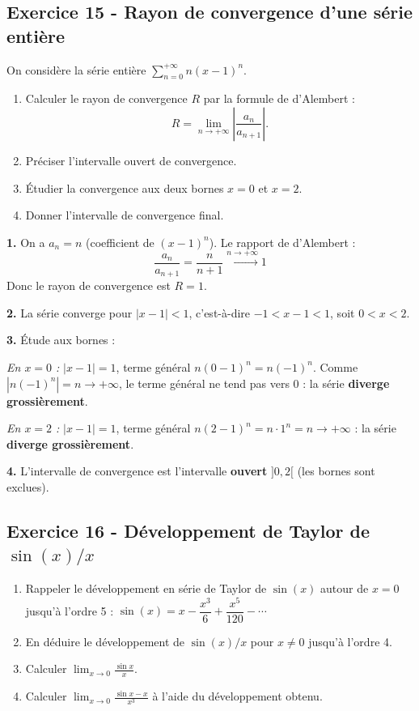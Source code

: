 \documentclass[12pt,a4paper]{article}
\begin{document}
\subsection*{Exercice 15 - Rayon de convergence d'une série entière \niveau{\moyen}}

\begin{boiteexercice}
On considère la série entière $\displaystyle\sum_{n=0}^{+\infty} n(x-1)^n$.
\begin{enumerate}
  \item Calculer le rayon de convergence $R$ par la formule
  de d'Alembert :
  \[ R = \lim_{n\to+\infty}\left|\dfrac{a_n}{a_{n+1}}\right|. \]
  \item Préciser l'intervalle ouvert de convergence.
  \item Étudier la convergence aux deux bornes $x = 0$ et $x = 2$.
  \item Donner l'intervalle de convergence final.
\end{enumerate}
\end{boiteexercice}

\begin{boitecorrige}
\textbf{1.} On a $a_n = n$ (coefficient de $(x-1)^n$). Le rapport de d'Alembert :
\[
\frac{a_n}{a_{n+1}} = \frac{n}{n+1} \xrightarrow{n\to+\infty} 1
\]
Donc le rayon de convergence est $R = 1$.

\textbf{2.} La série converge pour $|x-1| < 1$, c'est-à-dire $-1 < x-1 < 1$, soit $\boxed{0 < x < 2}$.

\textbf{3.} Étude aux bornes :

\textit{En $x = 0$ :} $|x-1| = 1$, terme général $n(0-1)^n = n(-1)^n$. Comme $|n(-1)^n| = n \to +\infty$, le terme général ne tend pas vers $0$ : la série \textbf{diverge grossièrement}.

\textit{En $x = 2$ :} $|x-1| = 1$, terme général $n(2-1)^n = n\cdot 1^n = n \to +\infty$ : la série \textbf{diverge grossièrement}.

\textbf{4.} L'intervalle de convergence est l'intervalle \textbf{ouvert} $]0, 2[$ (les bornes sont exclues).
\end{boitecorrige}

\subsection*{Exercice 16 - Développement de Taylor de $\sin(x)/x$ \niveau{\moyen}}

\begin{boiteexercice}
\begin{enumerate}
  \item Rappeler le développement en série de Taylor de $\sin(x)$ autour de $x = 0$ jusqu'à l'ordre 5 :
  $\sin(x) = x - \dfrac{x^3}{6} + \dfrac{x^5}{120} - \cdots$
  \item En déduire le développement de $\sin(x)/x$ pour $x \neq 0$ jusqu'à l'ordre 4.
  \item Calculer $\displaystyle\lim_{x\to 0}\frac{\sin x}{x}$.
  \item Calculer $\displaystyle\lim_{x\to 0}\frac{\sin x - x}{x^3}$ à l'aide du développement obtenu.
\end{enumerate}
\end{boiteexercice}
\end{document}
